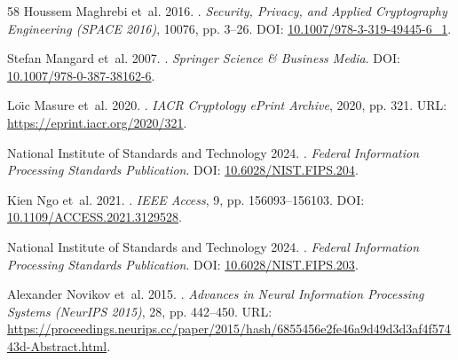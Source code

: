 \documentclass[letterpaper]{article}
\begin{document}
\begin{thebibliography}{58}
Houssem Maghrebi et~al. 2016.
.
\newblock \emph{Security, Privacy, and Applied Cryptography Engineering (SPACE 2016)}, 10076, pp. 3--26.
\newblock DOI: \href{https://doi.org/10.1007/978-3-319-49445-6_1}{10.1007/978-3-319-49445-6_1}.

Stefan Mangard et~al. 2007.
.
\newblock \emph{Springer Science \& Business Media}.
\newblock DOI: \href{https://doi.org/10.1007/978-0-387-38162-6}{10.1007/978-0-387-38162-6}.

Lo{\"\i}c Masure et~al. 2020.
.
\newblock \emph{IACR Cryptology ePrint Archive}, 2020, pp. 321.
\newblock URL: \url{https://eprint.iacr.org/2020/321}.

{National Institute of Standards and Technology} 2024.
.
\newblock \emph{Federal Information Processing Standards Publication}.
\newblock DOI: \href{https://doi.org/10.6028/NIST.FIPS.204}{10.6028/NIST.FIPS.204}.

Kien Ngo et~al. 2021.
.
\newblock \emph{IEEE Access}, 9, pp. 156093--156103.
\newblock DOI: \href{https://doi.org/10.1109/ACCESS.2021.3129528}{10.1109/ACCESS.2021.3129528}.

{National Institute of Standards and Technology} 2024.
.
\newblock \emph{Federal Information Processing Standards Publication}.
\newblock DOI: \href{https://doi.org/10.6028/NIST.FIPS.203}{10.6028/NIST.FIPS.203}.

Alexander Novikov et~al. 2015.
.
\newblock \emph{Advances in Neural Information Processing Systems (NeurIPS 2015)}, 28, pp. 442--450.
\newblock URL: \url{https://proceedings.neurips.cc/paper/2015/hash/6855456e2fe46a9d49d3d3af4f57443d-Abstract.html}.


\end{thebibliography}
\end{document}
